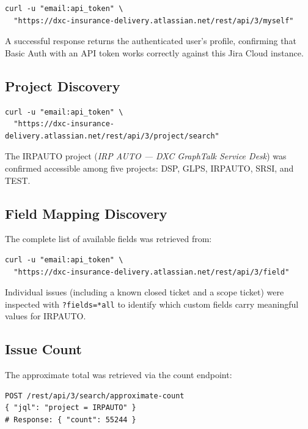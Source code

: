 \documentclass[12pt, a4paper]{article}
\begin{document}
\begin{lstlisting}[style=bash, caption={Verify API credentials}]
curl -u "email:api_token" \
  "https://dxc-insurance-delivery.atlassian.net/rest/api/3/myself"
\end{lstlisting}

A successful response returns the authenticated user's profile, confirming that Basic Auth
with an API token works correctly against this Jira Cloud instance.

\subsection{Project Discovery}

\begin{lstlisting}[style=bash, caption={List accessible projects}]
curl -u "email:api_token" \
  "https://dxc-insurance-delivery.atlassian.net/rest/api/3/project/search"
\end{lstlisting}

The IRPAUTO project (\textit{IRP AUTO — DXC GraphTalk Service Desk}) was confirmed accessible
among five projects: DSP, GLPS, IRPAUTO, SRSI, and TEST.

\subsection{Field Mapping Discovery}

The complete list of available fields was retrieved from:

\begin{lstlisting}[style=bash, caption={Retrieve all field definitions}]
curl -u "email:api_token" \
  "https://dxc-insurance-delivery.atlassian.net/rest/api/3/field"
\end{lstlisting}

Individual issues (including a known closed ticket and a scope ticket) were inspected
with \texttt{?fields=*all} to identify which custom fields carry meaningful values for IRPAUTO.

\subsection{Issue Count}

The approximate total was retrieved via the count endpoint:

\begin{lstlisting}[style=bash, caption={Approximate issue count}]
POST /rest/api/3/search/approximate-count
{ "jql": "project = IRPAUTO" }
# Response: { "count": 55244 }
\end{lstlisting}
\end{document}
